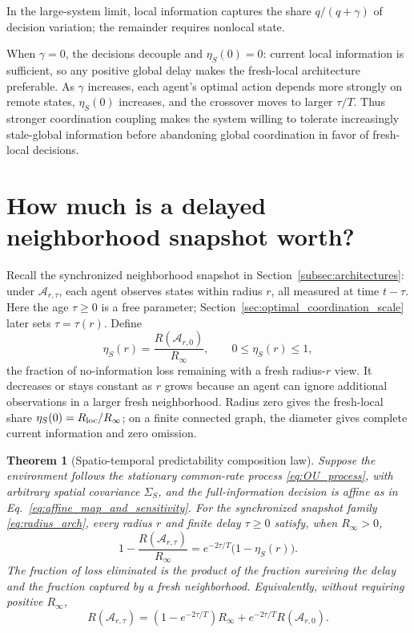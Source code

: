 \documentclass[11pt]{article}
\newtheorem{theorem}{Theorem}
\begin{document}
In the large-system limit, local information captures the share
$q/(q+\gamma)$ of decision variation; the remainder requires nonlocal state.

When $\gamma=0$, the decisions decouple and
$\eta_S(0)=0$: current local information is sufficient, so any
positive global delay makes the fresh-local architecture preferable. As $\gamma$
increases, each agent's optimal action depends more strongly on remote states,
$\eta_S(0)$ increases, and the crossover moves to larger
$\tau/T$. Thus stronger coordination coupling makes the system willing to
tolerate increasingly stale-global information before abandoning global
coordination in favor of fresh-local decisions.

\section{How much is a delayed neighborhood snapshot worth?}
\label{sec:spatiotemporal_predictability}

Recall the synchronized neighborhood snapshot in Section~\ref{subsec:architectures}:
under $\mathcal A_{r,\tau}$, each agent observes states within radius $r$,
all measured at time $t-\tau$. Here the age $\tau\ge0$ is a free parameter;
Section~\ref{sec:optimal_coordination_scale} later sets $\tau=\tau(r)$.
Define
\begin{equation}
\eta_S(r)=\frac{R(\mathcal A_{r,0})}{R_\infty},\qquad 0\le\eta_S(r)\le1,
\label{eq:eta_S_definition}
\end{equation}
the fraction of no-information loss remaining with a fresh radius-$r$ view.
It decreases or stays constant as $r$ grows because an agent can ignore
additional observations in a larger fresh neighborhood. Radius zero gives
the fresh-local share $\eta_S(0)=R_{\rm loc}/R_\infty$; on a finite connected
graph, the diameter gives complete current information and zero omission.

\begin{theorem}[Spatio-temporal predictability composition law]
\label{thm:spatiotemporal_composition}
Suppose the environment follows the stationary common-rate process
\eqref{eq:OU_process}, with arbitrary spatial covariance $\Sigma_S$, and the
full-information decision is affine as in
Eq.~\eqref{eq:affine_map_and_sensitivity}. For the synchronized snapshot
family \eqref{eq:radius_arch}, every radius $r$ and finite delay $\tau\ge0$
satisfy, when $R_\infty>0$,
\begin{equation}
\boxed{1-\frac{R(\mathcal A_{r,\tau})}{R_\infty}
=e^{-2\tau/T}\bigl(1-\eta_S(r)\bigr).}
\label{eq:regret_composition_normalized}
\end{equation}
The fraction of loss eliminated is the product of the fraction surviving
the delay and the fraction captured by a fresh neighborhood.
Equivalently, without requiring positive $R_\infty$,
\begin{equation}
R(\mathcal A_{r,\tau})=(1-e^{-2\tau/T})R_\infty
+e^{-2\tau/T}R(\mathcal A_{r,0}).
\label{eq:regret_composition_unnormalized}
\end{equation}
\end{theorem}
\end{document}

